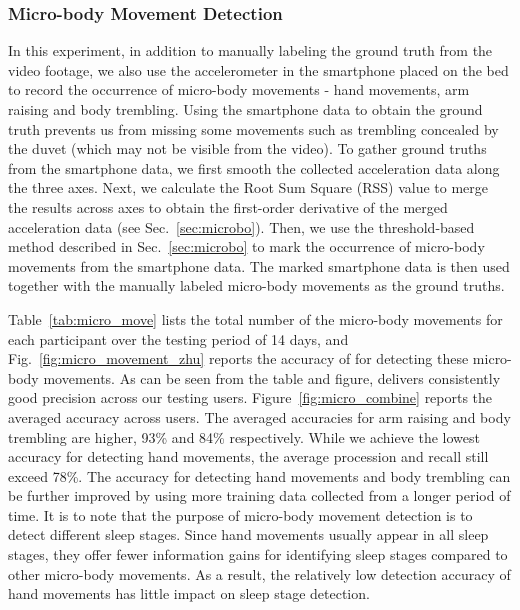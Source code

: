 \subsubsection{Micro-body Movement Detection}

In this experiment, in addition to manually labeling the ground truth from the video footage, we also use the accelerometer in the
smartphone placed on the bed to record the occurrence of micro-body movements - hand movements, arm raising and body trembling. Using the
smartphone data to obtain the ground truth prevents us from missing some movements such as trembling concealed by the duvet (which may not
be visible from the video). To gather ground truths from the smartphone data, we first smooth the collected acceleration data along the
three axes. Next, we calculate the Root Sum Square (RSS) value to merge the results across axes to obtain the first-order derivative of the
merged acceleration data (see Sec.~\ref{sec:microbo}). Then, we use the threshold-based method described in Sec.~\ref{sec:microbo} to mark
the occurrence of micro-body movements from the smartphone data. The marked smartphone data is then used together with the manually labeled
micro-body movements as the ground truths.

Table~\ref{tab:micro_move} lists the total number of the micro-body movements for each participant over the testing period of 14 days, and
Fig.~\ref{fig:micro_movement_zhu} reports the accuracy of {\systemname} for detecting these micro-body movements. As can be seen from the
table and figure, \systemname delivers consistently good precision across our testing users. Figure~\ref{fig:micro_combine} reports the
averaged accuracy across users. The averaged accuracies for arm raising and body trembling are higher, 93\% and 84\% respectively. While we
achieve the lowest accuracy for detecting hand movements, the average procession and recall still exceed 78\%. The accuracy for detecting
hand movements and body trembling can be further improved by using more training data collected from a longer period of time. It is to note
that the purpose of micro-body movement detection is to detect different sleep stages. Since hand movements usually appear in all sleep
stages, they offer fewer information gains for identifying sleep stages compared to other micro-body movements.  As a result, the
relatively low detection accuracy of hand movements has little impact on sleep stage detection.


